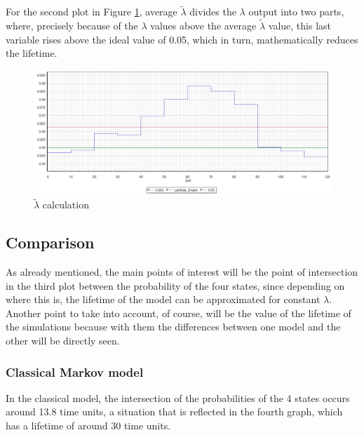 \documentclass{article}
\begin{document}
\begin{doublespacing}
\par For the second plot in Figure \ref{fig:LambdaCalculation}, average $\tilde{\lambda}$ divides the $\lambda$ output into two parts, where, precisely because of the $\lambda$ values above the average $\tilde{\lambda}$ value, this last variable rises above the ideal value of 0.05, which in turn, mathematically reduces the lifetime.

\begin{figure}[H] 
    \centering
    \includegraphics[width=1.0\textwidth]{Images/LambdaCalculation.JPG} 
    \caption{$\tilde{\lambda}$ calculation} 
    \label{fig:LambdaCalculation} 
\end{figure}



\subsection{Comparison}

\par As already mentioned, the main points of interest will be the point of intersection in the third plot between the probability of the four states, since depending on where this is, the lifetime of the model can be approximated for constant $\lambda$. Another point to take into account, of course, will be the value of the lifetime of the simulations because with them the differences between one model and the other will be directly seen.

\subsubsection{Classical Markov model}

\par In the classical model, the intersection of the probabilities of the 4 states occurs around 13.8 time units, a situation that is reflected in the fourth graph, which has a lifetime of around 30 time units.


\end{doublespacing}
\end{document}
